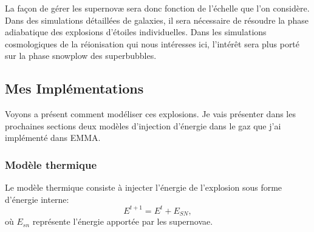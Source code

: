La façon de gérer les supernovæ sera donc fonction de l'échelle que l'on considère.
Dans des simulations détaillées de galaxies, il sera nécessaire de résoudre la phase adiabatique des explosions d'étoiles individuelles. %
Dans les simulations cosmologiques de la réionisation qui nous intéresses ici, l’intérêt sera plus porté sur la phase snowplow des superbubbles.

%

\subsection{Mes Implémentations}
\label{sec:SNmodel}


Voyons a présent comment modéliser ces explosions.
Je vais présenter dans les prochaines sections deux modèles d'injection d’énergie dans le gaz que j'ai implémenté dans EMMA.

\subsubsection{Modèle thermique}
Le modèle thermique consiste à injecter l’énergie de l'explosion sous forme d’énergie interne:
\begin{equation}
E^{t+1} = E^t + E_{SN},
\end{equation}
où $E_{sn}$ représente l'énergie apportée par les supernovae.

